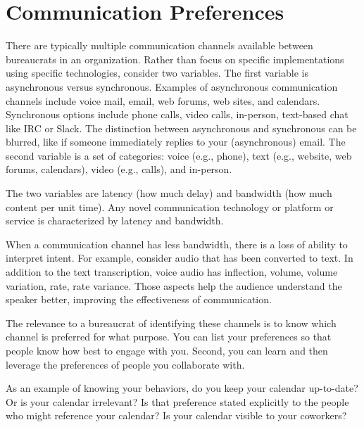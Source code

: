 \section{Communication Preferences\label{sec:communication-preferences}}

There are typically multiple communication channels available between bureaucrats in an organization. Rather than focus on specific implementations using specific technologies, consider two variables. The first variable is asynchronous versus synchronous. Examples of asynchronous communication channels include voice mail, email, web forums, web sites, and calendars. Synchronous options include phone calls, video calls, in-person, text-based chat like IRC or Slack. 
The distinction between asynchronous and synchronous can be blurred, like if someone immediately replies to your (asynchronous) email.  The second variable is a set of categories: voice (e.g., phone), text (e.g., website, web forums, calendars), video (e.g., calls), and in-person. 

The two variables are  latency (how much delay) and bandwidth (how much content per unit time). Any novel communication technology or platform or service is characterized by latency and bandwidth. 

When a communication channel has less bandwidth, there is a loss of ability to interpret intent. 
For example, consider audio that has been converted to text. In addition to the text transcription, voice audio  has inflection, volume, volume variation, rate, rate variance. Those aspects help the audience understand the speaker better, improving the effectiveness of communication.

The relevance to a bureaucrat of identifying these channels is to know which channel is preferred for what purpose.  You can list your preferences so that people know how best to engage with you.
Second, you can learn and then leverage the preferences of people you collaborate with.

As an example of knowing your behaviors, do you keep your calendar up-to-date? Or is your calendar irrelevant? Is that preference stated explicitly to the people who might reference your calendar? Is your calendar visible to your coworkers?

